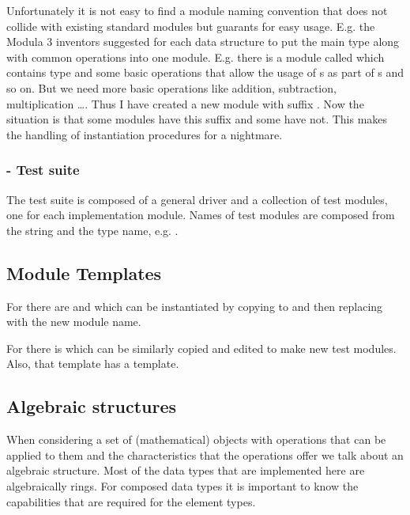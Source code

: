 Unfortunately it is not easy to find a module naming convention
that does not collide with existing standard modules
but guarants for easy usage.
E.g. the Modula 3 inventors suggested for each data structure
to put the main type along with common operations into one module.
E.g. there is a module called 
which contains type  and
some basic operations that allow the usage
of s as part of s and so on.
But we need more basic operations
like addition, subtraction, multiplication \dots{}.
Thus I have created a new module with suffix .
Now the situation is that some modules have this suffix
and some have not.
This makes the handling of instantiation procedures
for  a nightmare.

\subsubsection{ - Test suite}

The test suite is composed of a general driver and a
collection of test modules, one for each implementation
module.
Names of test modules are composed from the string 
and the type name, e.g. .


\subsection{Module Templates}

For  there are
 and  which can be instantiated
by copying to and then replacing  with the new module name.

For  there is 
which can be similarly copied and
edited to make new test modules.
Also, that template has a  template.


\subsection{Algebraic structures}
When considering a set of (mathematical) objects
with operations that can be applied to them
and the characteristics that the operations offer
we talk about an algebraic structure.
Most of the data types that are implemented here
are algebraically rings.
For composed data types it is important to know
the capabilities that are required for the element types.

